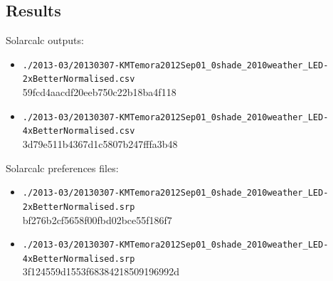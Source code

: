 \documentclass[12pt,a4paper]{book}
\begin{document}
    \subsection*{Results}
      Solarcalc outputs:
      \begin{itemize} \itemsep1pt \parskip0pt 
          \item \verb+./2013-03/20130307-KMTemora2012Sep01_0shade_2010weather_LED-2xBetterNormalised.csv+\\
            59fcd4aacdf20eeb750c22b18ba4f118
          \item \verb+./2013-03/20130307-KMTemora2012Sep01_0shade_2010weather_LED-4xBetterNormalised.csv+\\
            3d79e511b4367d1c5807b247fffa3b48
      \end{itemize}
      Solarcalc preferences files:
      \begin{itemize} \itemsep1pt \parskip0pt 
          \item \verb+./2013-03/20130307-KMTemora2012Sep01_0shade_2010weather_LED-2xBetterNormalised.srp+\\
            bf276b2cf5658f00fbd02bce55f186f7
          \item \verb+./2013-03/20130307-KMTemora2012Sep01_0shade_2010weather_LED-4xBetterNormalised.srp+\\
            3f124559d1553f68384218509196992d
      \end{itemize}
\end{document}

